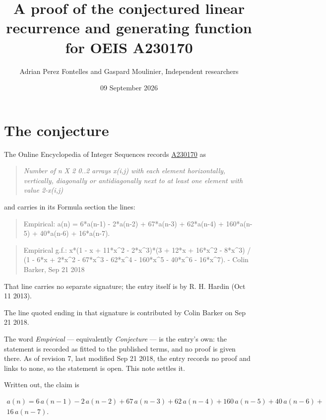\documentclass[11pt]{article}
\title{A proof of the conjectured linear recurrence and generating function for OEIS A230170}
\author{Adrian Perez Fontelles and Gaspard Moulinier, Independent researchers}
\date{09 September 2026}
\theoremstyle{definition}
\begin{document}
\maketitle
\section{The conjecture}

The Online Encyclopedia of Integer Sequences records \href{https://oeis.org/A230170}{A230170} as

\begin{quote}\itshape Number of n X 2 0..2 arrays x(i,j) with each element horizontally, vertically, diagonally or antidiagonally next to at least one element with value 2-x(i,j)\end{quote}

and carries in its Formula section the lines:

\begin{quote}\ttfamily Empirical: a(n) = 6*a(n-1) - 2*a(n-2) + 67*a(n-3) + 62*a(n-4) + 160*a(n-5) + 40*a(n-6) + 16*a(n-7).\end{quote}

\begin{quote}\ttfamily Empirical g.f.: x*(1 - x + 11*x\textasciicircum{}2 - 2*x\textasciicircum{}3)*(3 + 12*x + 16*x\textasciicircum{}2 - 8*x\textasciicircum{}3) / (1 - 6*x + 2*x\textasciicircum{}2 - 67*x\textasciicircum{}3 - 62*x\textasciicircum{}4 - 160*x\textasciicircum{}5 - 40*x\textasciicircum{}6 - 16*x\textasciicircum{}7). - Colin Barker, Sep 21 2018\end{quote}

That line carries no separate signature; the entry itself is by R. H. Hardin (Oct 11 2013).

The line quoted ending in that signature is contributed by Colin Barker on Sep 21 2018.

The word {\itshape Empirical} --- equivalently {\itshape Conjecture} --- is the entry's own: the statement is recorded as fitted to the published terms, and no proof is given there. As of revision 7, last modified Sep 21 2018, the entry records no proof and links to none, so the statement is open. This note settles it.

Written out, the claim is

\begin{multline*} a(n) = 6\,a(n-1) - 2\,a(n-2) + 67\,a(n-3) + 62\,a(n-4) + 160\,a(n-5) + 40\,a(n-6) + \\ 16\,a(n-7). \end{multline*}
\end{document}
